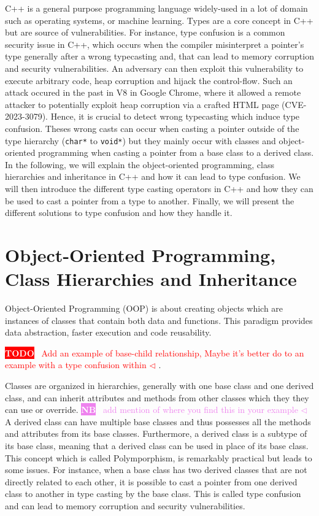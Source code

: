 \documentclass[a4paper,11pt,oneside]{report}
\newcommand{\todobox}[3]{%
       \colorbox{#1}{\textcolor{white}{\sffamily\bfseries\scriptsize #2}}%
       ~\textcolor{#1}{#3} %
       \textcolor{#1}{$\triangleleft$}%
}
\newcommand{\nb}[1]{\todobox{violet}{NB}{#1}}
\newcommand{\adrbqt}[1]{\todobox{red}{TODO}{#1}}
\begin{document}
C++ is a general purpose programming language widely-used in a lot of domain such as operating systems, 
or machine learning. Types are a core concept in C++ but are source of vulnerabilities. For instance, type confusion 
is a common security issue in C++, which occurs when the compiler misinterpret a pointer's type generally after a wrong typecasting and,
that can lead to memory corruption and security vulnerabilities. An adversary can then exploit this vulnerability to execute arbitrary code, heap corruption and hijack the control-flow.
Such an attack occured in the past in V8 in Google Chrome, where it allowed a remote attacker to potentially exploit
heap corruption via a crafted HTML page (CVE-2023-3079). Hence, it is crucial to detect wrong typecasting which induce type confusion. 
Theses wrong casts can occur when casting a pointer outside of the type hierarchy (\texttt{char*} to \texttt{void*}) but they mainly occur with classes and object-oriented programming 
when casting a pointer from a base class to a derived class. In the following, we will explain the object-oriented programming, class hierarchies and inheritance in C++ and how it can lead to type confusion. 
We will then introduce the different type casting operators in C++ and how they can be used to cast a pointer from a type to another. Finally, we will present the different solutions to type confusion and how they handle it.

\section{Object-Oriented Programming, Class Hierarchies and Inheritance} \label{sec:cpp_oop}
Object-Oriented Programming (OOP) is about creating objects which are instances of classes that contain both data and functions. This paradigm provides
data abstraction, faster execution and code reusability. 

\adrbqt{Add an example of base-child relationship, Maybe it's better do to an example with a type confusion within}.

Classes are organized in hierarchies, generally with one base class and one derived class, and can inherit attributes and methods from other classes which they
they can use or override. \nb{add mention of where you find this in your example}A derived class can have multiple base classes and thus possesses all the methods and attributes from its base classes. 
Furthermore, a derived class is a subtype of its base class, meaning that a derived class can be used in place of its base class. This concept which is called 
Polymporphism, is remarkably practical but leads to some issues. For instance, when a base class has two derived classes that are not directly related to each other, 
it is possible to cast a pointer from one derived class to another in type casting by the base class.
This is called type confusion and can lead to memory corruption and security vulnerabilities.
\end{document}
